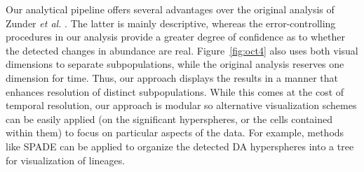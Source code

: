 \documentclass{article}
\begin{document}


Our analytical pipeline offers several advantages over the original analysis of Zunder \emph{et al.} \cite{zunder2015continuous}.
The latter is mainly descriptive, whereas the error-controlling procedures in our analysis provide a greater degree of confidence as to whether the detected changes in abundance are real.
Figure~\ref{fig:oct4} also uses both visual dimensions to separate subpopulations, while the original analysis reserves one dimension for time.
Thus, our approach displays the results in a manner that enhances resolution of distinct subpopulations.
While this comes at the cost of temporal resolution, our approach is modular so alternative visualization schemes can be easily applied (on the significant hyperspheres, or the cells contained within them) to focus on particular aspects of the data.
For example, methods like SPADE can be applied to organize the detected DA hyperspheres into a tree for visualization of lineages.
\end{document}
